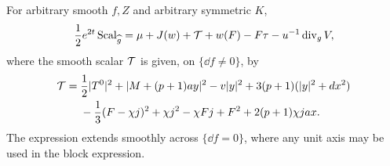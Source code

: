\begin{proposition}\label{four:sys:scalar-proposition}
For arbitrary smooth $f,Z$ and arbitrary symmetric $K$,
\begin{equation}\label{four:eq:scalar-identity}
 \frac12 e^{2t}\operatorname{Scal}_{\widehat g}
 =\mu+J(w)+\mathcal T+w(F)-F\tau-u^{-1}\operatorname{div}_g V,
\end{equation}
where the smooth scalar $\mathcal T$ is given, on $\{\dd f\ne0\}$, by
\begin{equation}\label{four:eq:quadratic-form}
\begin{aligned}
 \mathcal T={}&\frac12|T^0|^2+|M+(p+1)ay|^2
       -v|y|^2+3(p+1)(|y|^2+d x^2)\\
 &-\frac13(F-\chi j)^2+\chi j^2-\chi Fj+F^2
       +2(p+1)\chi jax.
\end{aligned}
\end{equation}
The expression extends smoothly across $\{\dd f=0\}$, where any unit
axis may be used in the block expression.
\end{proposition}

